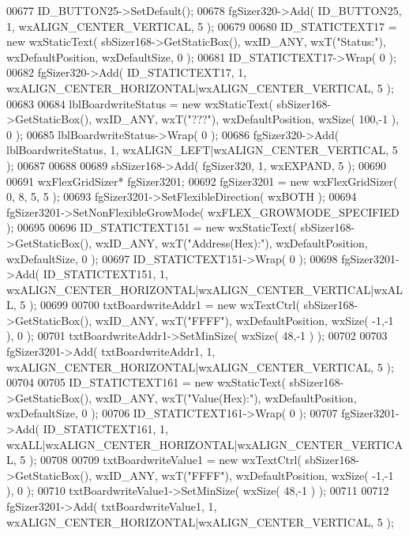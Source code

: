\begin{DoxyCode}
00677     ID_BUTTON25->SetDefault(); 
00678     fgSizer320->Add( ID_BUTTON25, 1, wxALIGN\_CENTER\_VERTICAL, 5 );
00679     
00680     ID_STATICTEXT17 = \textcolor{keyword}{new} wxStaticText( sbSizer168->GetStaticBox(), wxID\_ANY, wxT(\textcolor{stringliteral}{"Status:"}), 
      wxDefaultPosition, wxDefaultSize, 0 );
00681     ID_STATICTEXT17->Wrap( 0 );
00682     fgSizer320->Add( ID_STATICTEXT17, 1, wxALIGN\_CENTER\_HORIZONTAL|wxALIGN\_CENTER\_VERTICAL, 5 );
00683     
00684     lblBoardwriteStatus = \textcolor{keyword}{new} wxStaticText( sbSizer168->GetStaticBox(), wxID\_ANY, wxT(\textcolor{stringliteral}{"???"}), 
      wxDefaultPosition, wxSize( 100,-1 ), 0 );
00685     lblBoardwriteStatus->Wrap( 0 );
00686     fgSizer320->Add( lblBoardwriteStatus, 1, wxALIGN\_LEFT|wxALIGN\_CENTER\_VERTICAL, 5 );
00687     
00688     
00689     sbSizer168->Add( fgSizer320, 1, wxEXPAND, 5 );
00690     
00691     wxFlexGridSizer* fgSizer3201;
00692     fgSizer3201 = \textcolor{keyword}{new} wxFlexGridSizer( 0, 8, 5, 5 );
00693     fgSizer3201->SetFlexibleDirection( wxBOTH );
00694     fgSizer3201->SetNonFlexibleGrowMode( wxFLEX\_GROWMODE\_SPECIFIED );
00695     
00696     ID_STATICTEXT151 = \textcolor{keyword}{new} wxStaticText( sbSizer168->GetStaticBox(), wxID\_ANY, wxT(\textcolor{stringliteral}{"Address(Hex):"}), 
      wxDefaultPosition, wxDefaultSize, 0 );
00697     ID_STATICTEXT151->Wrap( 0 );
00698     fgSizer3201->Add( ID_STATICTEXT151, 1, wxALIGN\_CENTER\_HORIZONTAL|wxALIGN\_CENTER\_VERTICAL|wxALL, 5 );
00699     
00700     txtBoardwriteAddr1 = \textcolor{keyword}{new} wxTextCtrl( sbSizer168->GetStaticBox(), wxID\_ANY, wxT(\textcolor{stringliteral}{"FFFF"}), 
      wxDefaultPosition, wxSize( -1,-1 ), 0 );
00701     txtBoardwriteAddr1->SetMinSize( wxSize( 48,-1 ) );
00702     
00703     fgSizer3201->Add( txtBoardwriteAddr1, 1, wxALIGN\_CENTER\_HORIZONTAL|wxALIGN\_CENTER\_VERTICAL, 5 );
00704     
00705     ID_STATICTEXT161 = \textcolor{keyword}{new} wxStaticText( sbSizer168->GetStaticBox(), wxID\_ANY, wxT(\textcolor{stringliteral}{"Value(Hex):"}), 
      wxDefaultPosition, wxDefaultSize, 0 );
00706     ID_STATICTEXT161->Wrap( 0 );
00707     fgSizer3201->Add( ID_STATICTEXT161, 1, wxALL|wxALIGN\_CENTER\_HORIZONTAL|wxALIGN\_CENTER\_VERTICAL, 5 );
00708     
00709     txtBoardwriteValue1 = \textcolor{keyword}{new} wxTextCtrl( sbSizer168->GetStaticBox(), wxID\_ANY, wxT(\textcolor{stringliteral}{"FFFF"}), 
      wxDefaultPosition, wxSize( -1,-1 ), 0 );
00710     txtBoardwriteValue1->SetMinSize( wxSize( 48,-1 ) );
00711     
00712     fgSizer3201->Add( txtBoardwriteValue1, 1, wxALIGN\_CENTER\_HORIZONTAL|wxALIGN\_CENTER\_VERTICAL, 5 );

\end{DoxyCode}
